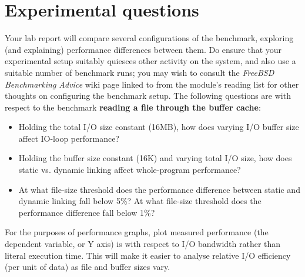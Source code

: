 \documentclass[a4paper,10pt]{article}
\begin{document}
\section*{Experimental questions}

Your lab report will compare several configurations of the benchmark,
exploring (and explaining) performance differences between them.
Do ensure that your experimental setup suitably quiesces other activity on the
system, and also use a suitable number of benchmark runs; you may wish to
consult the \textit{FreeBSD Benchmarking Advice} wiki page linked to from the
module's reading list for other thoughts on configuring the benchmark setup.
The following questions are with respect to the benchmark \textbf{reading a
file through the buffer cache}:

\begin{itemize}
  \item Holding the total I/O size constant (16MB), how does varying I/O
    buffer size affect IO-loop performance?
  \item Holding the buffer size constant (16K) and varying total I/O size, how
     does static vs. dynamic linking affect whole-program performance?
  \item At what file-size threshold does the performance difference between
    static and dynamic linking fall below 5\%?  At what file-size threshold
    does the performance difference fall below 1\%?
\end{itemize}

\noindent
For the purposes of performance graphs, plot measured performance (the
dependent variable, or Y axis) is with respect to I/O bandwidth rather than
literal execution time.
This will make it easier to analyse relative I/O efficiency (per unit of data)
as file and buffer sizes vary.
\end{document}
